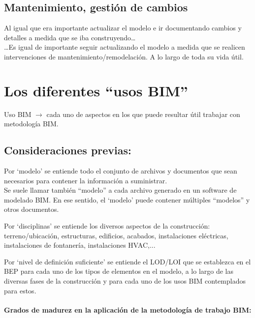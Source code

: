 \documentclass[spanish,12pt,a4paper,final,oneside]{book}
\begin{document}
\section{Mantenimiento, gestión de cambios}
Al igual que era importante actualizar el modelo e ir documentando cambios y detalles a medida que se iba construyendo\ldots 
\\ \ldots Es igual de importante seguir actualizando el modelo a medida que se realicen intervenciones de mantenimiento/remodelación. A lo largo de toda su vida útil.

\chapter{Los diferentes ``usos BIM''}
Uso BIM $\rightarrow$ cada uno de aspectos en los que puede resultar útil trabajar con metodología BIM.


\section{Consideraciones previas:}

Por `modelo' se entiende todo el conjunto de archivos y documentos que sean necesarios para contener la información a suministrar.
\\{\footnotesize Se suele llamar también ``modelo'' a cada archivo generado en un software de modelado BIM. En ese sentido, el `modelo' puede contener múltiples ``modelos'' y otros documentos.}

Por `disciplinas' se entiende los diversos aspectos de la construcción: terreno/ubicación, estructuras, edificios, acabados, instalaciones eléctricas, instalaciones de fontanería, instalaciones HVAC,...

Por `nivel de definición suficiente' se entiende el LOD/LOI que se establezca en el BEP para cada uno de los tipos de elementos en el modelo, a lo largo de las diversas fases de la construcción y para cada uno de los usos BIM contemplados para estos.




\subsubsection{Grados de madurez en la aplicación de la metodología de trabajo BIM:}
\end{document}
